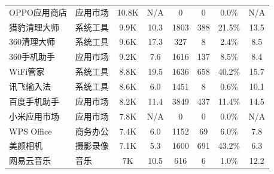 \begin{ThreePartTable}
\begin{longtable}{l l c c c c c c}
        OPPO应用商店                    & 应用市场   & 10.8K                      & N/A                        & 0              & 0                          & 0.0\%        & N/A                        \\
        \rowcolor{gray!15} 猎豹清理大师 & 系统工具   & 9.9K                       & 10.3                       & 1803           & 388                        & 21.5\%       & 13.5                       \\
        360清理大师                     & 系统工具   & 9.6K                       & 17.3                       & 327            & 8                          & 2.4\%        & 8.5                        \\
        \rowcolor{gray!15} 360手机助手  & 应用市场   & 9.2K                       & 7.6                        & 1616           & 137                        & 8.5\%        & 8.4                        \\
        WiFi管家                        & 系统工具   & 8.8K                       & 19.5                       & 1636           & 658                        & 40.2\%       & 15.7                       \\
        \rowcolor{gray!15} 讯飞输入法   & 系统工具   & 8.6K                       & 6.0                        & 1451           & 8                          & 0.6\%        & 10.1                       \\
        百度手机助手                    & 应用市场   & 8.2K                       & 11.4                       & 3849           & 437                        & 11.4\%       & 14.5                       \\
        \rowcolor{gray!15} 小米应用市场 & 应用市场   & 7.8K                       & N/A                        & 0              & 0                          & 0.0\%        & N/A                        \\
        WPS Office                      & 商务办公   & 7.4K                       & 6.0                        & 1152           & 69                         & 6.0\%        & 7.8                        \\
        \rowcolor{gray!15} 美颜相机     & 摄影录像   & 7.1K                       & 5.3                        & 1600           & 691                        & 43.2\%       & 6.3                        \\
        网易云音乐                      & 音乐       & 7K                         & 10.5                       & 616            & 6                          & 1.0\%        & 12.2                       \\

\end{longtable}
\end{ThreePartTable}
